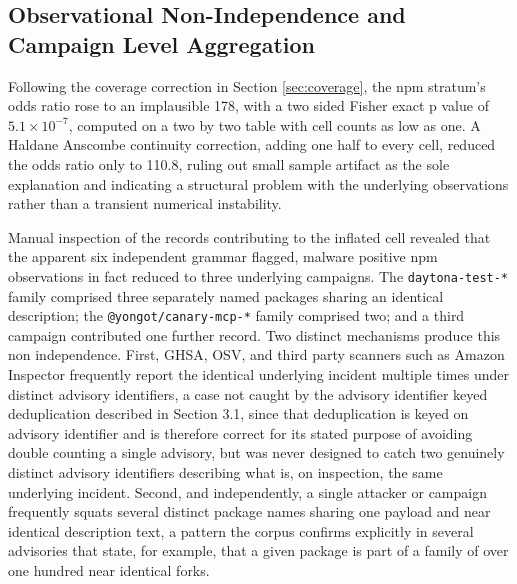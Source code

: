 \documentclass[journal]{IEEEtran}
\begin{document}
\subsection{Observational Non-Independence and Campaign Level Aggregation}
\label{sec:nonindependence}

Following the coverage correction in Section \ref{sec:coverage}, the npm stratum's odds ratio rose to an implausible 178, with a two sided Fisher exact p value of $5.1 \times 10^{-7}$, computed on a two by two table with cell counts as low as one. A Haldane Anscombe continuity correction, adding one half to every cell, reduced the odds ratio only to 110.8, ruling out small sample artifact as the sole explanation and indicating a structural problem with the underlying observations rather than a transient numerical instability.

Manual inspection of the records contributing to the inflated cell revealed that the apparent six independent grammar flagged, malware positive npm observations in fact reduced to three underlying campaigns. The \texttt{daytona-test-*} family comprised three separately named packages sharing an identical description; the \texttt{@yongot/canary-mcp-*} family comprised two; and a third campaign contributed one further record. Two distinct mechanisms produce this non independence. First, GHSA, OSV, and third party scanners such as Amazon Inspector frequently report the identical underlying incident multiple times under distinct advisory identifiers, a case not caught by the advisory identifier keyed deduplication described in Section 3.1, since that deduplication is keyed on advisory identifier and is therefore correct for its stated purpose of avoiding double counting a single advisory, but was never designed to catch two genuinely distinct advisory identifiers describing what is, on inspection, the same underlying incident. Second, and independently, a single attacker or campaign frequently squats several distinct package names sharing one payload and near identical description text, a pattern the corpus confirms explicitly in several advisories that state, for example, that a given package is part of a family of over one hundred near identical forks.
\end{document}
